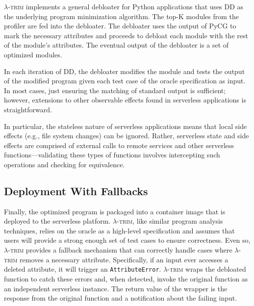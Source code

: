 \documentclass[sigplan,screen]{acmart}
\newcommand{\sys}{\textsc{\ensuremath{\lambda}-trim}\xspace}
\begin{document}
\sys implements a general debloater for Python applications that uses DD as the underlying program minimization algorithm.
The top-K modules from the profiler are fed into the debloater.
The debloater uses the output of PyCG to mark the necessary attributes and proceeds to debloat each module with the rest of the module's attributes.
The eventual output of the debloater is a set of optimized modules.



In each iteration of DD, the debloater modifies the module and tests the output of the modified program given each test case of the oracle specification as input.
In most cases, just ensuring the matching of standard output is sufficient;
however, extensions to other observable effects found in serverless applications is straightforward.

In particular, the stateless nature of serverless applications means that local side effects (e.g., file system changes) can be ignored.
Rather, serverless state and side effects are comprised of external calls to remote services and other serverless functions---validating these types of functions involves intercepting such operations and checking for equivalence.








%
 
\subsection{Deployment With Fallbacks}\label{sec:fallback}






Finally, the optimized program is packaged into a container image that is deployed to the serverless platform.
\sys, like similar program analysis techniques, relies on the oracle as a high-level specification and assumes that users will provide a strong enough set of test cases to ensure correctness.
Even so, \sys provides a fallback mechanism that can correctly handle cases where \sys removes a necessary attribute.
Specifically, if an input ever accesses a deleted attribute, it will trigger an \texttt{AttributeError}.
\sys wraps the debloated function to catch these errors and, when detected, invoke the original function as an independent serverless instance. 
The return value of the wrapper is the response from the original function and a notification about the failing input.
\end{document}
